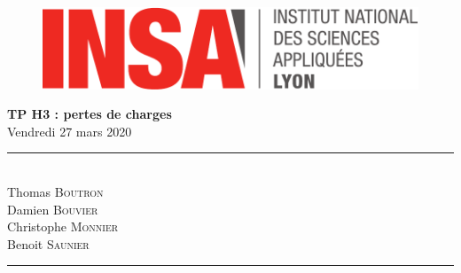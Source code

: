 \begin{titlepage}
	\begin{figure}[t]
	\centering
	\includegraphics[scale=0.7]{insa.pdf}
	\end{figure}
	\vspace*{\fill}	
	\centering
	\Huge{\bfseries {TP H3 : pertes de charges }}\\
	 \Huge{Vendredi 27 mars 2020} \\
	

\vspace*{\fill}
\rule{0.40\linewidth}{.2pt}\\
   \Large{Thomas \textsc{Boutron}} \\
   \Large{Damien \textsc{Bouvier}}\\
   \Large{ Christophe \textsc{Monnier}} \\
\Large{Benoit \textsc{Saunier}} \\
\rule{0.40\linewidth}{.2pt}\\
	
\end{titlepage}